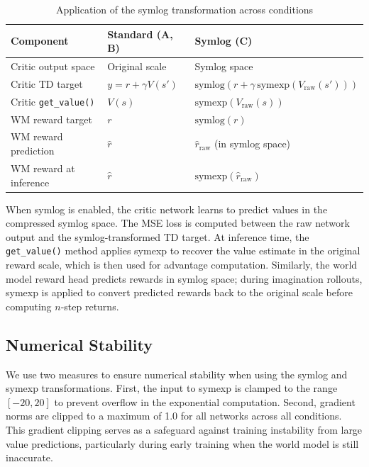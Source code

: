 \begin{table}[!ht]
    \centering
    \caption{Application of the symlog transformation across conditions}
    \label{tab:symlog_application}
    \begin{tabular}{lll}
        \toprule
        \textbf{Component} & \textbf{Standard (A, B)} & \textbf{Symlog (C)} \\
        \midrule
        Critic output space   & Original scale       & Symlog space \\
        Critic TD target      & $y = r + \gamma V(s')$ & $\text{symlog}(r + \gamma\, \text{symexp}(V_{\text{raw}}(s')))$ \\
        Critic \texttt{get\_value()} & $V(s)$        & $\text{symexp}(V_{\text{raw}}(s))$ \\
        WM reward target      & $r$                  & $\text{symlog}(r)$ \\
        WM reward prediction  & $\hat{r}$            & $\hat{r}_{\text{raw}}$ (in symlog space) \\
        WM reward at inference & $\hat{r}$           & $\text{symexp}(\hat{r}_{\text{raw}})$ \\
        \bottomrule
    \end{tabular}
\end{table}

When symlog is enabled, the critic network learns to predict values in the
compressed symlog space. The MSE loss is computed between the raw network output
and the symlog-transformed TD target. At inference time, the \texttt{get\_value()}
method applies symexp to recover the value estimate in the original reward scale,
which is then used for advantage computation. Similarly, the world model reward
head predicts rewards in symlog space; during imagination rollouts, symexp is
applied to convert predicted rewards back to the original scale before computing
$n$-step returns.

\subsection{Numerical Stability}
\label{subsec:method_stability}

We use two measures to ensure numerical stability when using the symlog and
symexp transformations. First, the input to symexp is clamped to the range
$[-20, 20]$ to prevent overflow in the exponential computation.
Second, gradient norms are clipped to a
maximum of 1.0 for all networks across all conditions. This gradient
clipping serves as a safeguard against training instability from
large value predictions, particularly during early training when the world model
is still inaccurate.

